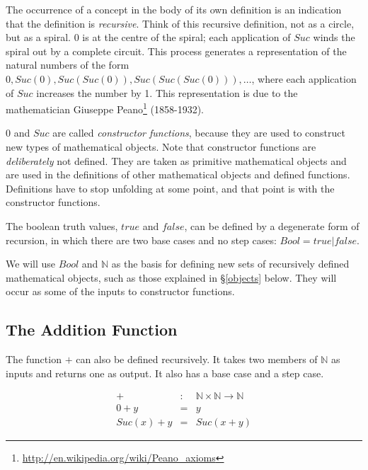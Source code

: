 \documentclass[twocolumn]{article}
\newcommand{\nat}{\mathbb{N}}
\begin{document}
The occurrence of a concept in the body of its own definition is an indication
that the definition is {\em recursive}. Think of this recursive definition, not
as a circle, but as a spiral.  $0$ is at the centre of the spiral; each
application of $Suc$ winds the spiral out by a complete circuit.  This process
generates a representation of the natural numbers of the form $0, Suc(0), Suc(Suc(0)),
Suc(Suc(Suc(0))), \ldots$, where each application of $Suc$ increases the number by
1. This representation is due to the mathematician Giuseppe
Peano\footnote{\url{http://en.wikipedia.org/wiki/Peano_axioms}} (1858-1932).

$0$ and $Suc$ are called {\em constructor functions}, because they are used to
construct new types of mathematical objects. Note that constructor functions are
{\em deliberately} not defined. They are taken as primitive mathematical objects
and are used in the definitions of other mathematical objects and defined
functions. Definitions have to stop unfolding at some point, and that point is
with the constructor functions.

The boolean truth values, $true$ and $false$, can be
defined by a degenerate form of recursion, in which there are two base
cases and no step cases: $Bool = true | false$. 

We will use $Bool$ and $\nat$ as the basis for defining new sets of recursively
defined mathematical objects, such as those explained in \S\ref{objects}
below. They will occur as some of the inputs to constructor functions.

\subsection{The Addition Function}
\label{addition}

The function $+$ can also be defined recursively. It takes
two members of $\nat$ as inputs and returns one as output.  It
also has a base case and a step case.

\begin{eqnarray}
 + & : & \nat \times \nat \rightarrow \nat \label{type} \\
0+y & = & y  \label{base} \\
Suc(x)+y & = & Suc(x+y) \label{step}
\end{eqnarray}
\end{document}
